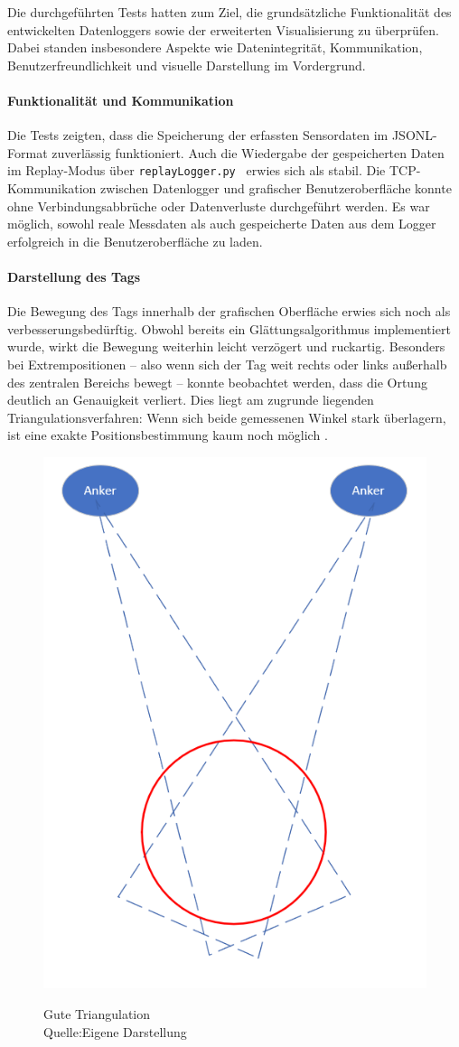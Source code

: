 \documentclass[a4paper, 12pt]{article} %
\begin{document}
Die durchgeführten Tests hatten zum Ziel, die grundsätzliche Funktionalität des entwickelten Datenloggers sowie der erweiterten Visualisierung zu 
überprüfen. Dabei standen insbesondere Aspekte wie Datenintegrität, Kommunikation, Benutzerfreundlichkeit und visuelle Darstellung im Vordergrund.

\paragraph{Funktionalität und Kommunikation}
Die Tests zeigten, dass die Speicherung der erfassten Sensordaten im \ac{JSONL}-Format zuverlässig funktioniert. Auch die Wiedergabe der gespeicherten Daten 
im Replay-Modus über \texttt{replayLogger.py \cite{tadic-studienarbeit-ui}} erwies sich als stabil. Die \ac{TCP}-Kommunikation zwischen Datenlogger und grafischer Benutzeroberfläche konnte 
ohne Verbindungsabbrüche oder Datenverluste durchgeführt werden. Es war möglich, sowohl reale Messdaten als auch gespeicherte Daten aus dem Logger 
erfolgreich in die Benutzeroberfläche zu laden.

\paragraph{Darstellung des Tags}
Die Bewegung des Tags innerhalb der grafischen Oberfläche erwies sich noch als verbesserungsbedürftig. Obwohl bereits ein Glättungsalgorithmus 
implementiert wurde, wirkt die Bewegung weiterhin leicht verzögert und ruckartig. Besonders bei Extrempositionen – also wenn sich der Tag weit 
rechts oder links außerhalb des zentralen Bereichs bewegt – konnte beobachtet werden, dass die Ortung deutlich an Genauigkeit verliert. Dies liegt
am zugrunde liegenden Triangulationsverfahren: Wenn sich beide gemessenen Winkel stark überlagern, ist eine exakte Positionsbestimmung kaum noch 
möglich \cite{thurmond2001point}.

\begin{figure}[H]
    \includegraphics[width=0.5\linewidth]{images/Gute Triangulation.png}\\[1ex]
    \centering
    \caption{Gute Triangulation \\
                Quelle:Eigene Darstellung}
    \label{ABBILDUNG}
\end{figure}
\end{document}
